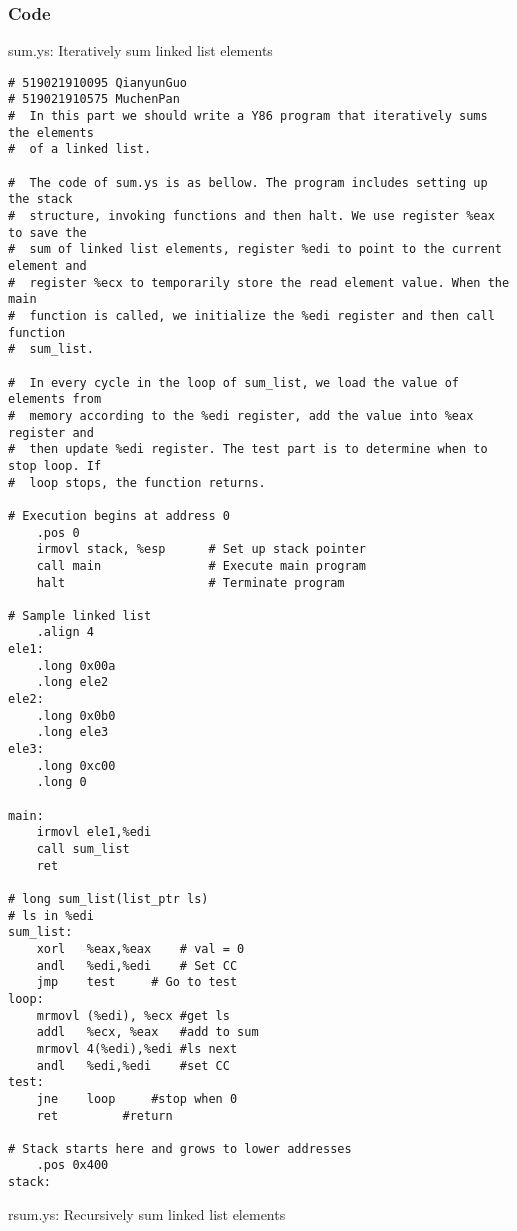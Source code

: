 \documentclass{article}
\begin{document}
\subsubsection{Code}

\begin{center}
{\ttfamily sum.ys}: Iteratively sum linked list elements
\end{center}

\begin{lstlisting}[language={[x86masm]Assembler}]
# 519021910095 QianyunGuo
# 519021910575 MuchenPan
#  In this part we should write a Y86 program that iteratively sums the elements 
#  of a linked list. 

#  The code of sum.ys is as bellow. The program includes setting up the stack 
#  structure, invoking functions and then halt. We use register %eax to save the 
#  sum of linked list elements, register %edi to point to the current element and 
#  register %ecx to temporarily store the read element value. When the main 
#  function is called, we initialize the %edi register and then call function 
#  sum_list. 

#  In every cycle in the loop of sum_list, we load the value of elements from 
#  memory according to the %edi register, add the value into %eax register and 
#  then update %edi register. The test part is to determine when to stop loop. If 
#  loop stops, the function returns.

# Execution begins at address 0
	.pos 0
	irmovl stack, %esp      # Set up stack pointer
	call main               # Execute main program
	halt                    # Terminate program

# Sample linked list
	.align 4
ele1:
    .long 0x00a
    .long ele2
ele2:
    .long 0x0b0
    .long ele3
ele3:
    .long 0xc00
    .long 0

main:
    irmovl ele1,%edi
    call sum_list
    ret

# long sum_list(list_ptr ls)
# ls in %edi
sum_list:
    xorl   %eax,%eax    # val = 0
    andl   %edi,%edi    # Set CC
    jmp    test		# Go to test
loop:
    mrmovl (%edi), %ecx	#get ls
    addl   %ecx, %eax	#add to sum
    mrmovl 4(%edi),%edi	#ls next
    andl   %edi,%edi	#set CC
test:
    jne    loop		#stop when 0
    ret			#return

# Stack starts here and grows to lower addresses
    .pos 0x400
stack:

\end{lstlisting}
\begin{center}
{\ttfamily rsum.ys}: Recursively sum linked list elements
\end{center}
\end{document}

